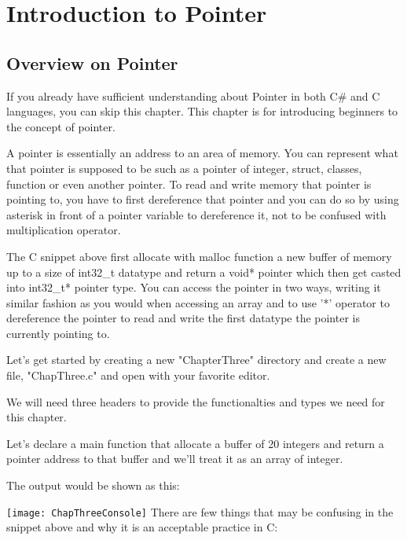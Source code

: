 \chapter{Introduction to Pointer}
\section{Overview on Pointer}
If you already have sufficient understanding about Pointer in both C\# and C languages, you can skip this chapter. This chapter is for introducing beginners to the concept of pointer.

A pointer is essentially an address to an area of memory. You can represent what that pointer is supposed to be such as a pointer of integer, struct, classes, function or even another pointer.
To read and write memory that pointer is pointing to, you have to first dereference that pointer and you can do so by using asterisk in front of a pointer variable to dereference it, not to be confused with multiplication operator.


\newpage
The C snippet above first allocate with malloc function a new buffer of memory up to a size of int32\_t datatype and return a void* pointer which then get casted into int32\_t* pointer type. You can access the pointer in two ways, writing it similar fashion as you would when accessing an array and to use '*' operator to dereference the pointer to read and write the first datatype the pointer is currently pointing to.

Let's get started by creating a new "ChapterThree" directory and create a new file, "ChapThree.c" and open with your favorite editor.

We will need three headers to provide the functionalties and types we need for this chapter.



Let's declare a main function that allocate a buffer of 20 integers and return a pointer address to that buffer and we'll treat it as an array of integer.


\newpage
The output would be shown as this:

\texttt{[image: ChapThreeConsole]}
\newpage
There are few things that may be confusing in the snippet above and why it is an acceptable practice in C:

